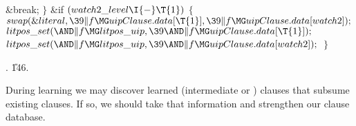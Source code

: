 \&{break};\2\6
\4${}\}{}$\2\6
\&{if} ${}(\\{watch2\_level}\I{-}\T{1}){}$\5
${}\{{}$\1\6
${}\\{swap}(\&{literal},\39\|f\MG\\{uipClause}.\\{data}[\T{1}],\39\|f\MG%
\\{uipClause}.\\{data}[\\{watch2}]);{}$\6
${}\\{litpos\_set}({\AND}\|f\MG\\{litpos\_uip},\39{\AND}\|f\MG\\{uipClause}.%
\\{data}[\T{1}]);{}$\6
${}\\{litpos\_set}({\AND}\|f\MG\\{litpos\_uip},\39{\AND}\|f\MG\\{uipClause}.%
\\{data}[\\{watch2}]);{}$\6
\4${}\}{}$\2\par
{}.
\U146.\fi

During learning we may discover learned (intermediate or \UIP) clauses
that
subsume existing clauses. If so, we should take that information and strengthen
our clause database.

